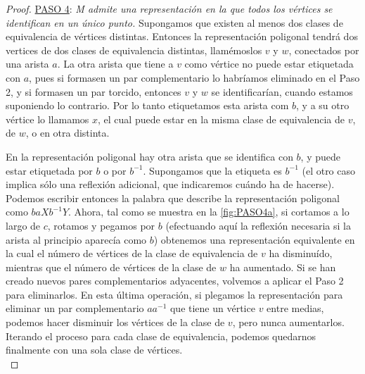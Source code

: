 \documentclass[10pt]{report}
\theoremstyle{definition}
\begin{document}
\begin{proof}


\underline{PASO 4}: \textit{M admite una representación en la que todos los vértices se identifican en un único punto.} Supongamos que existen al menos dos clases de equivalencia de vértices distintas. Entonces la representación poligonal tendrá dos vertices de dos clases de equivalencia distintas, llamémoslos $v$ y $w$, conectados por una arista $a$. La otra arista que tiene a $v$ como vértice no puede estar etiquetada con $a$, pues si formasen un par complementario lo habríamos eliminado en el Paso 2, y si formasen un par torcido, entonces $v$ y $w$ se identificarían, cuando estamos suponiendo lo contrario. 
Por lo tanto etiquetamos esta arista com $b$, y a su otro vértice lo llamamos $x$, el cual puede estar en la misma clase de equivalencia de $v$, de $w$, o en otra distinta.

En la representación poligonal hay otra arista que se identifica con $b$, y puede estar etiquetada por $b$ o por $b^{-1}$. Supongamos que la etiqueta es $b^{-1}$ (el otro caso implica sólo una reflexión adicional, que indicaremos cuándo ha de hacerse). Podemos escribir entonces la palabra que describe la representación poligonal como $baXb^{-1}Y$. Ahora, tal como se muestra en la \autoref{fig:PASO4a}, si cortamos a lo largo de $c$, rotamos y pegamos por $b$ (efectuando aquí la reflexión necesaria si la arista al principio aparecía como $b$) obtenemos una representación equivalente en la cual el número de vértices de la clase de equivalencia de $v$ ha disminuído, mientras que el número de vértices de la clase de $w$ ha aumentado. Si se han creado nuevos pares complementarios adyacentes, volvemos a aplicar el Paso 2 para eliminarlos. En esta última operación, si plegamos la representación para eliminar un par complementario $aa^{-1}$ que tiene un vértice $v$ entre medias, podemos hacer disminuir los vértices de la clase de $v$, pero nunca aumentarlos. Iterando el proceso para cada clase de equivalencia, podemos quedarnos finalmente con una sola clase de vértices.\\
 

\end{proof}
\end{document}
